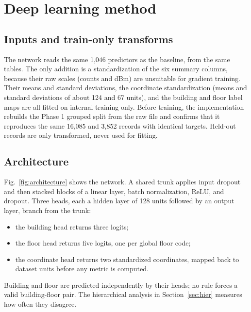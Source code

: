 \documentclass[conference]{IEEEtran}
\begin{document}
\section{Deep learning method}
\subsection{Inputs and train-only transforms}
The network reads the same 1,046 predictors as the baseline, from the same tables. The only addition is a standardization of the six summary columns, because their raw scales (counts and dBm) are unsuitable for gradient training. Their means and standard deviations, the coordinate standardization (means and standard deviations of about 124 and 67 units), and the building and floor label maps are all fitted on internal training only. Before training, the implementation rebuilds the Phase 1 grouped split from the raw file and confirms that it reproduces the same 16,085 and 3,852 records with identical targets. Held-out records are only transformed, never used for fitting.

\subsection{Architecture}
Fig.~\ref{fig:architecture} shows the network. A shared trunk applies input dropout and then stacked blocks of a linear layer, batch normalization, ReLU, and dropout. Three heads, each a hidden layer of 128 units followed by an output layer, branch from the trunk:
\begin{itemize}
  \item the building head returns three logits;
  \item the floor head returns five logits, one per global floor code;
  \item the coordinate head returns two standardized coordinates, mapped back to dataset units before any metric is computed.
\end{itemize}
Building and floor are predicted independently by their heads; no rule forces a valid building-floor pair. The hierarchical analysis in Section~\ref{sec:hier} measures how often they disagree.
\end{document}
